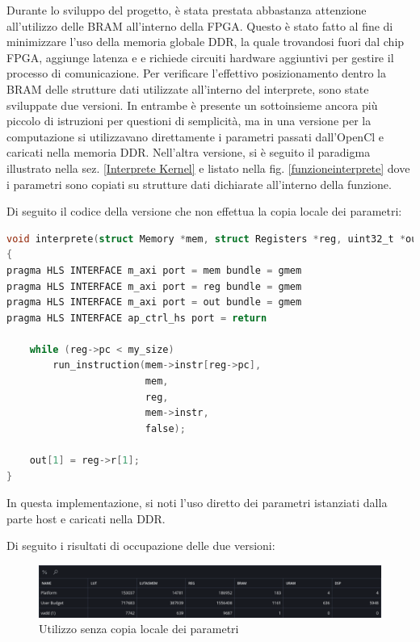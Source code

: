 \vspace{0.3cm}

Durante lo sviluppo del progetto, è stata prestata abbastanza attenzione all'utilizzo delle BRAM all'interno della FPGA. Questo è stato fatto al fine di minimizzare l'uso della memoria globale DDR, la quale trovandosi fuori dal chip FPGA, aggiunge latenza e e richiede circuiti hardware aggiuntivi per gestire il processo di comunicazione.
Per verificare l'effettivo posizionamento dentro la BRAM delle strutture dati utilizzate all'interno del interprete, sono state sviluppate due versioni. In entrambe è presente un sottoinsieme ancora più piccolo di istruzioni per questioni di semplicità, ma in una versione per la computazione si utilizzavano direttamente i parametri passati dall'OpenCl e caricati nella memoria DDR. Nell'altra versione, si è seguito il paradigma illustrato nella sez. \ref{Interprete Kernel} e listato nella fig. \ref{funzioneinterprete} dove i parametri sono copiati su strutture dati dichiarate all'interno della funzione.

Di seguito il codice della versione che non effettua la copia locale dei parametri:

\begin{lstlisting}[language=C]
void interprete(struct Memory *mem, struct Registers *reg, uint32_t *out, ap_uint<32> my_size)
{
pragma HLS INTERFACE m_axi port = mem bundle = gmem
pragma HLS INTERFACE m_axi port = reg bundle = gmem
pragma HLS INTERFACE m_axi port = out bundle = gmem
pragma HLS INTERFACE ap_ctrl_hs port = return

	while (reg->pc < my_size)
		run_instruction(mem->instr[reg->pc], 
						mem, 
						reg, 
						mem->instr, 
						false);

	out[1] = reg->r[1];
}
\end{lstlisting}

In questa implementazione, si noti l'uso diretto dei parametri istanziati dalla parte host e caricati nella DDR.

\vspace{0.3cm}

Di seguito i risultati di occupazione delle due versioni:

\begin{figure}[h!]
\centering
\includegraphics[scale=0.40]{images/Capitolo5/9_im.png}
\caption{Utilizzo senza copia locale dei parametri}
\label{nopragma}
\end{figure}

